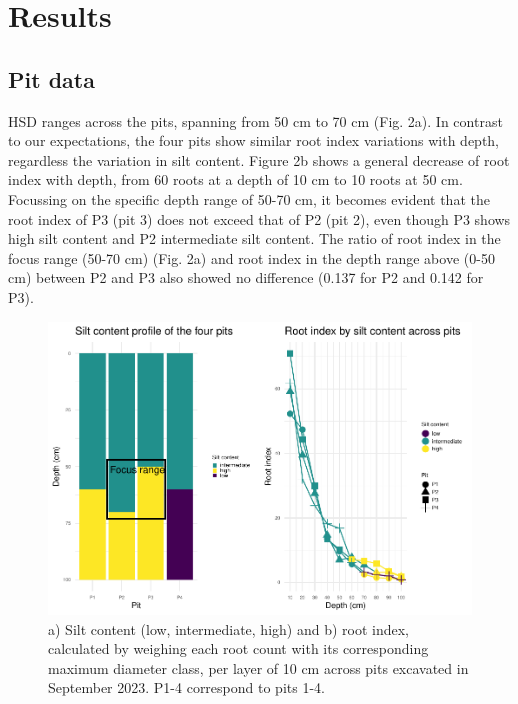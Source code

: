 \documentclass[fleqn,12pt]{latex/stylish_article} %
\begin{document}
\hypertarget{results}{%
\section{Results}\label{results}}

\hypertarget{pit-data}{%
\subsection{Pit data}\label{pit-data}}

HSD ranges across the pits, spanning from 50 cm to 70 cm (Fig. 2a). In contrast to our expectations, the four pits show similar root index variations with depth, regardless the variation in silt content. Figure 2b shows a general decrease of root index with depth, from 60 roots at a depth of 10 cm to 10 roots at 50 cm. Focussing on the specific depth range of 50-70 cm, it becomes evident that the root index of P3 (pit 3) does not exceed that of P2 (pit 2), even though P3 shows high silt content and P2 intermediate silt content. The ratio of root index in the focus range (50-70 cm) (Fig. 2a) and root index in the depth range above (0-50 cm) between P2 and P3 also showed no difference (0.137 for P2 and 0.142 for P3).



\scriptsize

\begin{figure}

{\centering \includegraphics[width=0.8\linewidth,]{pedoP16-report_files/figure-latex/pit-1} 

}

\caption{a) Silt content (low, intermediate, high) and b) root index, calculated by weighing each root count with its corresponding maximum diameter class, per layer of 10 cm across pits excavated in September 2023. P1-4 correspond to pits 1-4.}\label{fig:pit}
\end{figure}
\end{document}
